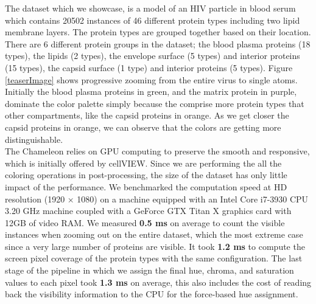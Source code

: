 \documentclass[review,journal]{vgtc}         %
\begin{document}
	The dataset which we showcase, is a model of an HIV particle in blood serum which contains 20502 instances of 46 different protein types including two lipid membrane layers.
	The protein types are grouped together based on their location.
	There are 6 different protein groups in the dataset; the blood plasma proteins (18 types), the lipids (2 types), the envelope surface (5 types) and interior proteins (15 types), the capsid surface (1 type) and interior proteins (5 types).
	Figure \ref{teaserImage} shows progressive zooming from the entire virus to single atoms.
	Initially the blood plasma proteins in green, and the matrix protein in purple, dominate the color palette simply because the comprise more protein types that other compartments, like the capsid proteins in orange.	
	As we get closer the capsid proteins in orange, we can observe that the colors are getting more distinguishable.\\
	
	The Chameleon relies on GPU computing to preserve the smooth and responsive, which is initially offered by cellVIEW.
	Since we are performing the all the coloring operations in post-processing, the size of the dataset has only little impact of the performance. 
	We benchmarked the computation speed at HD resolution (1920 × 1080) on a machine equipped with an Intel Core i7-3930 CPU 3.20 GHz machine coupled with a GeForce GTX Titan X graphics card with 12GB of video RAM.
	We measured \textbf{0.5 ms} on average to count the visible instances when zooming out on the entire dataset, which the most extreme case since a very large number of proteins are visible.	
	It took \textbf{1.2 ms} to compute the screen pixel coverage of the protein types with the same configuration.
	The last stage of the pipeline in which we assign the final hue, chroma, and saturation values to each pixel took \textbf{1.3 ms} on average, this also includes the cost of reading back the visibility information to the CPU for the force-based hue assignment.
		
\end{document}
